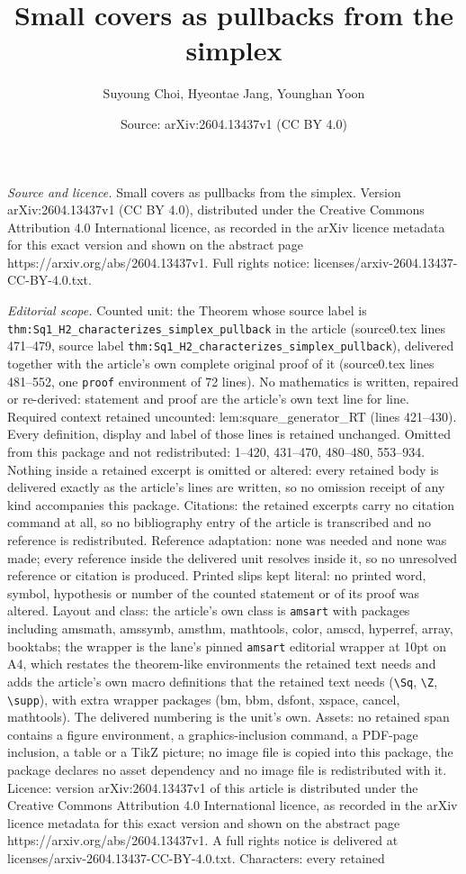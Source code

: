 \documentclass[10pt,a4paper]{amsart}
\title[Small covers as pullbacks from the simplex]{Small covers as pullbacks from the simplex}
\author{Suyoung Choi, Hyeontae Jang, Younghan Yoon}
\date{Source: arXiv:2604.13437v1 (CC BY 4.0)}
\begin{document}
\maketitle

\noindent\emph{Source and licence.} Small covers as pullbacks from the simplex. Version arXiv:2604.13437v1 (CC BY 4.0), distributed under the Creative Commons Attribution 4.0 International licence, as recorded in the arXiv licence metadata for this exact version and shown on the abstract page https://arxiv.org/abs/2604.13437v1. Full rights notice: licenses/arxiv-2604.13437-CC-BY-4.0.txt.\par\smallskip

\noindent\textit{Editorial scope.} Counted unit: the Theorem whose source label is \texttt{thm:Sq1\_H2\_characterizes\_simplex\_pullback} in the article (source0.tex lines 471--479, source label \texttt{thm:Sq1\_H2\_characterizes\_simplex\_pullback}), delivered together with the article's own complete original proof of it (source0.tex lines 481--552, one \texttt{proof} environment of 72 lines). No mathematics is written, repaired or re-derived: statement and proof are the article's own text line for line. Required context retained uncounted: lem:square\_generator\_RT (lines 421--430). Every definition, display and label of those lines is retained unchanged. Omitted from this package and not redistributed: 1--420, 431--470, 480--480, 553--934. Nothing inside a retained excerpt is omitted or altered: every retained body is delivered exactly as the article's lines are written, so no omission receipt of any kind accompanies this package. Citations: the retained excerpts carry no citation command at all, so no bibliography entry of the article is transcribed and no reference is redistributed. Reference adaptation: none was needed and none was made; every reference inside the delivered unit resolves inside it, so no unresolved reference or citation is produced. Printed slips kept literal: no printed word, symbol, hypothesis or number of the counted statement or of its proof was altered. Layout and class: the article's own class is \texttt{amsart} with packages including amsmath, amssymb, amsthm, mathtools, color, amscd, hyperref, array, booktabs; the wrapper is the lane's pinned \texttt{amsart} editorial wrapper at 10pt on A4, which restates the theorem-like environments the retained text needs and adds the article's own macro definitions that the retained text needs (\texttt{\textbackslash Sq}, \texttt{\textbackslash Z}, \texttt{\textbackslash supp}), with extra wrapper packages (bm, bbm, dsfont, xspace, cancel, mathtools). The delivered numbering is the unit's own. Assets: no retained span contains a figure environment, a graphics-inclusion command, a PDF-page inclusion, a table or a TikZ picture; no image file is copied into this package, the package declares no asset dependency and no image file is redistributed with it. Licence: version arXiv:2604.13437v1 of this article is distributed under the Creative Commons Attribution 4.0 International licence, as recorded in the arXiv licence metadata for this exact version and shown on the abstract page https://arxiv.org/abs/2604.13437v1. A full rights notice is delivered at licenses/arxiv-2604.13437-CC-BY-4.0.txt. Characters: every retained 
\end{document}
